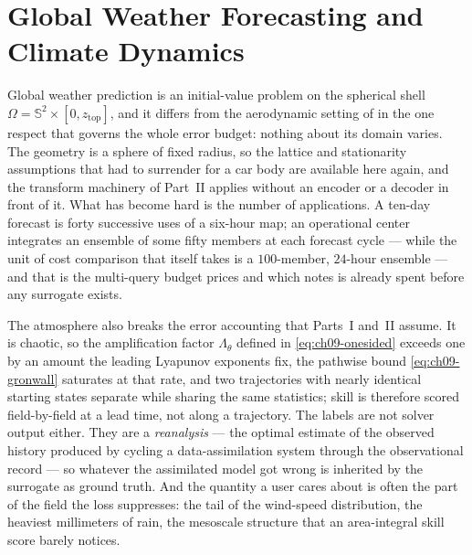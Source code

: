 
\chapter{Global Weather Forecasting and Climate Dynamics}
\label{ch:part3-global-weather-forecasting-and-climate-dyn}
\label{sec:climate}

Global weather prediction is an initial-value problem on the spherical shell
$\Omega = \mathbb{S}^2 \times [0, z_{\text{top}}]$, and it differs from the aerodynamic
setting of  in the one respect
that governs the whole error budget: nothing about its domain varies. The geometry is a
sphere of fixed radius, so the lattice and stationarity assumptions that
 had to surrender for a car
body are available here again, and the transform machinery of Part~II applies without an
encoder or a decoder in front of it. What has become hard is the number of applications.
A ten-day forecast is forty successive uses of a six-hour map; an operational center
integrates an ensemble of some fifty members at each forecast cycle --- while the
unit of cost comparison that \cite{pathak2022fourcastnet} itself takes is a
$100$-member, $24$-hour ensemble --- and that is the multi-query budget
 prices and which
 notes is already spent
before any surrogate exists. 

The atmosphere also breaks the error accounting that Parts~I and~II assume. It is chaotic,
so the amplification factor $\Lambda_\theta$ defined in \eqref{eq:ch09-onesided} exceeds one
by an amount the leading Lyapunov exponents fix, the pathwise bound \eqref{eq:ch09-gronwall}
saturates at that rate, and two trajectories with nearly identical starting states separate
while sharing the same statistics; skill is therefore scored field-by-field at a lead
time, not along a trajectory. The labels are not solver output either. They are a
\emph{reanalysis} --- the optimal estimate of the observed history produced by cycling a
data-assimilation system through the observational record \cite{hersbach2020era5} --- so whatever the assimilated
model got wrong is inherited by the surrogate as ground truth. And the quantity a user
cares about is often the part of the field the loss suppresses: the tail of the wind-speed
distribution, the heaviest millimeters of rain, the mesoscale structure that an
area-integral skill score barely notices.

